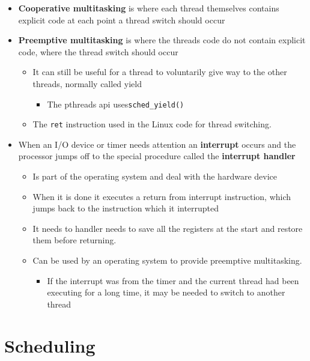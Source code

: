 \documentclass[11pt]{article}
\providecommand{\tightlist}{%
      \setlength{\itemsep}{0pt}\setlength{\parskip}{0pt}}
\begin{document}
\begin{itemize}
\tightlist
\item
  \textbf{Cooperative multitasking} is where each thread themselves
  contains explicit code at each point a thread switch should occur
\item
  \textbf{Preemptive multitasking} is where the threads code do not
  contain explicit code, where the thread switch should occur

  \begin{itemize}
  \tightlist
  \item
    It can still be useful for a thread to voluntarily give way to the
    other threads, normally called yield

    \begin{itemize}
    \tightlist
    \item
      The pthreads api uses\texttt{sched\_yield()}
    \end{itemize}
  \item
    The \texttt{ret} instruction used in the Linux code for thread
    switching.
  \end{itemize}
\item
  When an I/O device or timer needs attention an \textbf{interrupt}
  occurs and the processor jumps off to the special procedure called the
  \textbf{interrupt handler}

  \begin{itemize}
  \tightlist
  \item
    Is part of the operating system and deal with the hardware device
  \item
    When it is done it executes a return from interrupt instruction,
    which jumps back to the instruction which it interrupted
  \item
    It needs to handler needs to save all the registers at the start and
    restore them before returning.
  \item
    Can be used by an operating system to provide preemptive
    multitasking.

    \begin{itemize}
    \tightlist
    \item
      If the interrupt was from the timer and the current thread had
      been executing for a long time, it may be needed to switch to
      another thread
    \end{itemize}
  \end{itemize}
\end{itemize}

    \section{Scheduling}\label{scheduling}
\end{document}
